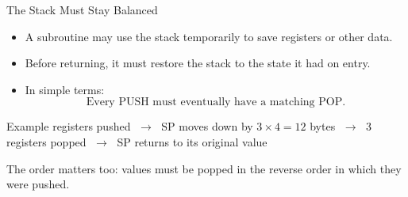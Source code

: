 \documentclass[9pt,aspectratio=169,xcolor=table]{beamer}
\begin{document}

\begin{frame}{The Stack Must Stay Balanced} \begin{itemize} \item A subroutine may use the stack temporarily to save registers or other data. \item Before returning, it must restore the stack to the state it had on entry. \item In simple terms: \[ \boxed{\text{Every PUSH must eventually have a matching POP.}} \] \end{itemize} \vspace{3mm} \begin{block}{Example}  registers pushed $\;\longrightarrow\;$ SP moves down by $3\times4=12$ bytes $\;\longrightarrow\;$ 3 registers popped $\;\longrightarrow\;$ SP returns to its original value \end{block} \vspace{3mm} {\small The order matters too: values must be popped in the \alert{reverse order} in which they were pushed. } \end{frame}

\end{document}
